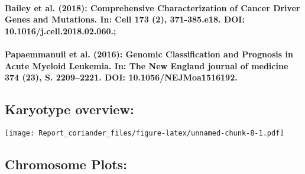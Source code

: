 \documentclass[]{article}
\let\oldparagraph\paragraph
\renewcommand{\paragraph}[1]{\oldparagraph{#1}\mbox{}}
\begin{document}
\hypertarget{bailey-et-al.-2018-comprehensive-characterization-of-cancer-driver-genes-and-mutations.-in-cell-173-2-371-385.e18.-doi-10.1016j.cell.2018.02.060.}{%
\paragraph{Bailey et al. (2018): Comprehensive Characterization of
Cancer Driver Genes and Mutations. In: Cell 173 (2), 371-385.e18. DOI:
10.1016/j.cell.2018.02.060.;}\label{bailey-et-al.-2018-comprehensive-characterization-of-cancer-driver-genes-and-mutations.-in-cell-173-2-371-385.e18.-doi-10.1016j.cell.2018.02.060.}}

\hypertarget{papaemmanuil-et-al.-2016-genomic-classification-and-prognosis-in-acute-myeloid-leukemia.-in-the-new-england-journal-of-medicine-374-23-s.-22092221.-doi-10.1056nejmoa1516192.}{%
\paragraph{Papaemmanuil et al. (2016): Genomic Classification and
Prognosis in Acute Myeloid Leukemia. In: The New England journal of
medicine 374 (23), S. 2209--2221. DOI:
10.1056/NEJMoa1516192.}\label{papaemmanuil-et-al.-2016-genomic-classification-and-prognosis-in-acute-myeloid-leukemia.-in-the-new-england-journal-of-medicine-374-23-s.-22092221.-doi-10.1056nejmoa1516192.}}

\hypertarget{karyotype-overview}{%
\subsection{Karyotype overview:}\label{karyotype-overview}}

\texttt{[image: Report\_coriander\_files/figure-latex/unnamed-chunk-8-1.pdf]}

\hypertarget{chromosome-plots}{%
\subsection{Chromosome Plots:}\label{chromosome-plots}}
\end{document}
